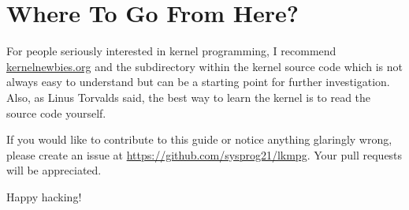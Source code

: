 \documentclass[10pt, oneside]{book}
\begin{document}
\section{Where To Go From Here?}
\label{sec:where_to_go}
For people seriously interested in kernel programming, I recommend \href{https://kernelnewbies.org}{kernelnewbies.org} and the  subdirectory within the kernel source code which is not always easy to understand but can be a starting point for further investigation.
Also, as Linus Torvalds said, the best way to learn the kernel is to read the source code yourself.

If you would like to contribute to this guide or notice anything glaringly wrong, please create an issue at \url{https://github.com/sysprog21/lkmpg}.
Your pull requests will be appreciated.

Happy hacking!
\end{document}
